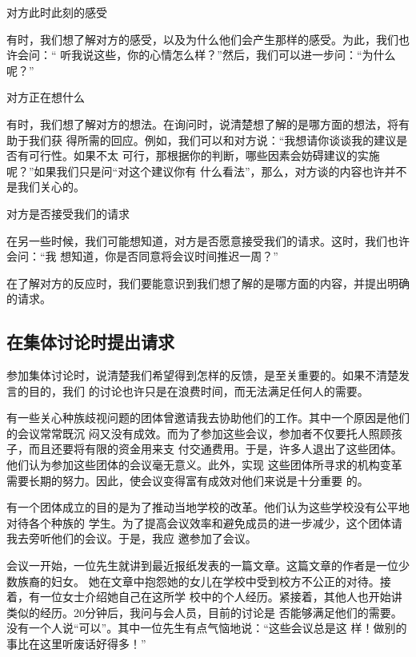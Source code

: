 \documentclass{ctexart}
\newcounter{edesc}
\begin{document}
\begin{edesc}
	\item[对方此时此刻的感受]

	有时，我们想了解对方的感受，以及为什么他们会产生那样的感受。为此，我们也许会问：``
	听我说这些，你的心情怎么样？''然后，我们可以进一步问：``为什么呢？''
	\item[对方正在想什么]

	有时，我们想了解对方的想法。在询问时，说清楚想了解的是哪方面的想法，将有助于我们获
	得所需的回应。例如，我们可以和对方说：``我想请你谈谈我的建议是否有可行性。如果不太
	可行，那根据你的判断，哪些因素会妨碍建议的实施呢？''如果我们只是问``对这个建议你有
	什么看法''，那么，对方谈的内容也许并不是我们关心的。
	\item[对方是否接受我们的请求]

	在另一些时候，我们可能想知道，对方是否愿意接受我们的请求。这时，我们也许会问：``我
	想知道，你是否同意将会议时间推迟一周？''

	在了解对方的反应时，我们要能意识到我们想了解的是哪方面的内容，并提出明确的请求。
\end{edesc}


\subsection{在集体讨论时提出请求}

参加集体讨论时，说清楚我们希望得到怎样的反馈，是至关重要的。如果不清楚发言的目的，我们
的讨论也许只是在浪费时间，而无法满足任何人的需要。

有一些关心种族歧视问题的团体曾邀请我去协助他们的工作。其中一个原因是他们的会议常常既沉
闷又没有成效。而为了参加这些会议，参加者不仅要托人照顾孩子，而且还要将有限的资金用来支
付交通费用。于是，许多人退出了这些团体。他们认为参加这些团体的会议毫无意义。此外，实现
这些团体所寻求的机构变革需要长期的努力。因此，使会议变得富有成效对他们来说是十分重要
的。

有一个团体成立的目的是为了推动当地学校的改革。他们认为这些学校没有公平地对待各个种族的
学生。为了提高会议效率和避免成员的进一步减少，这个团体请我去旁听他们的会议。于是，我应
邀参加了会议。

会议一开始，一位先生就讲到最近报纸发表的一篇文章。这篇文章的作者是一位少数族裔的妇女。
她在文章中抱怨她的女儿在学校中受到校方不公正的对待。接着，有一位女士介绍她自己在这所学
校中的个人经历。紧接着，其他人也开始讲类似的经历。20分钟后，我问与会人员，目前的讨论是
否能够满足他们的需要。没有一个人说``可以''。其中一位先生有点气恼地说：``这些会议总是这
样！做别的事比在这里听废话好得多！''
\end{document}

